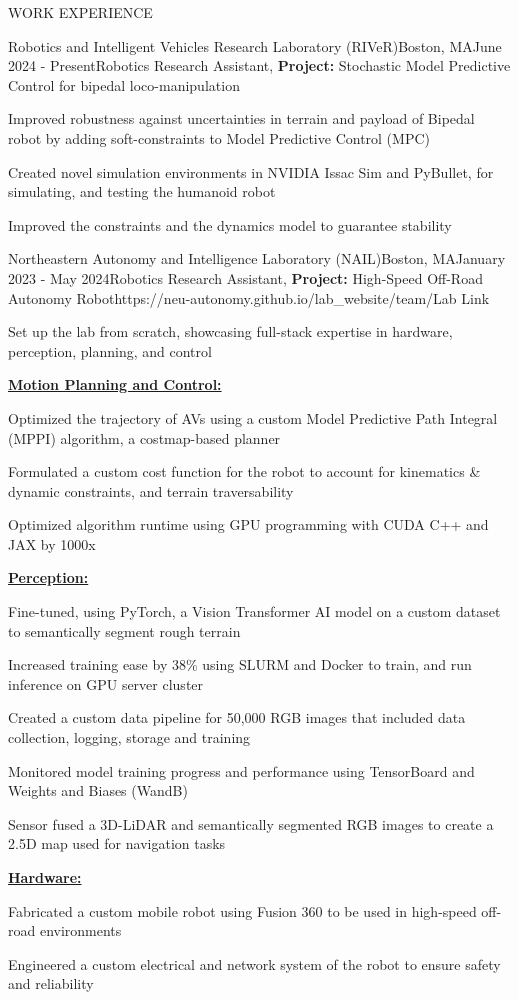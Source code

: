 \documentclass{resume} %
\begin{document}
\begin{rSection}{WORK EXPERIENCE}
	\begin{rProjExpDetails}{Robotics and Intelligent Vehicles Research Laboratory (RIVeR)}{Boston, MA}{June 2024 - Present}{Robotics Research Assistant, \textbf{Project:} Stochastic Model Predictive Control for bipedal loco-manipulation}{}{}
		\item Improved robustness against uncertainties in terrain and payload of Bipedal robot by adding soft-constraints to Model Predictive Control (MPC)
		\item Created novel simulation environments in NVIDIA Issac Sim and PyBullet, for simulating, and testing the humanoid robot
		\item Improved the constraints and the dynamics model to guarantee stability
	\end{rProjExpDetails}
	\begin{rProjExpDetails}{Northeastern Autonomy and Intelligence Laboratory (NAIL)}{Boston, MA}{January 2023 - May 2024}{Robotics Research Assistant, \textbf{Project:} High-Speed Off-Road Autonomy Robot}{https://neu-autonomy.github.io/lab_website/team/}{Lab Link}
		\item Set up the lab from scratch, showcasing full-stack expertise in hardware, perception, planning, and control
		\item[] \underline{\textbf{Motion Planning and Control:}}
		\item Optimized the trajectory of AVs using a custom Model Predictive Path Integral (MPPI) algorithm, a costmap-based planner
		\item Formulated a custom cost function for the robot to account for kinematics \& dynamic constraints, and terrain traversability
		\item Optimized algorithm runtime using GPU programming with CUDA C++ and JAX by 1000x
		\item[] \underline{\textbf{Perception:}}
		\item Fine-tuned, using PyTorch, a Vision Transformer AI model on a custom dataset to semantically segment rough terrain
		\item Increased training ease by 38\% using SLURM and Docker to train, and run inference on GPU server cluster
		\item Created a custom data pipeline for 50,000 RGB images that included data collection, logging, storage and training
		\item Monitored model training progress and performance using TensorBoard and Weights and Biases (WandB)
		\item Sensor fused a 3D-LiDAR and semantically segmented RGB images to create a 2.5D map used for navigation tasks
		\item[] \underline{\textbf{Hardware:}}
		\item Fabricated a custom mobile robot using Fusion 360 to be used in high-speed off-road environments
		\item Engineered a custom electrical and network system of the robot to ensure safety and reliability
	\end{rProjExpDetails}


\end{rSection}
\end{document}
